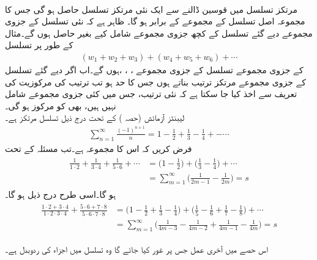 \quad {}\\
مرتکز تسلسل میں قوسین ڈالنے سے ایک نئی مرتکز تسلسل حاصل ہو گی جس کا مجموعہ اصل تسلسل کے مجموعے کے برابر ہو گا۔
\quad
ظاہر ہے کہ نئی تسلسل کے جزوی مجموعے دیے گئے تسلسل کے کچھ جزوی مجموعے  شامل کیے بغیر حاصل ہوں گے۔مثال کے طور پر تسلسل
\begin{align*}
(w_1+w_2+w_3)+(w_4+w_5+w_6)+\cdots
\end{align*} 
کے جزوی مجموعے تسلسل  کے جزوی مجموعے  ، ، ، ہوں گے۔اب اگر دیے گئے تسلسل کے جزوی مجموعے  مرتکز ترتیب بناتے ہوں جس کا حد  ہو تب ترتیب کی مرکوزیت کی تعریف سے اخذ کیا جا سکتا ہے کہ نئی ترتیب، جس میں کئی جزوی مجموعے شامل نہیں ہیں، بھی  کو مرکوز ہو گی۔
\quad {}\\
لیبنٹز آزمائش (حصہ ) کے تحت درج ذیل تسلسل مرتکز ہے۔
\begin{align*}
\sum\limits_{n=1}^{\infty} \frac{(-1)^{n+1}}{n}=1-\frac{1}{2}+\frac{1}{3}-\frac{1}{4}+-\cdots
\end{align*}
فرض کریں کہ اس کا مجموعہ  ہے۔تب مسئلہ  کے تحت
\begin{gather}
\begin{aligned}\label{مساوات_ترتیب_تسلسل_ایک}
\frac{1}{1\cdot 2}+\frac{1}{3\cdot 4}+\frac{1}{5\cdot 6}+\cdots&=\big(1-\frac{1}{2}\big)+\big(\frac{1}{3}-\frac{1}{4}\big)+\cdots\\
&=\sum\limits_{m=1}^{\infty}\big(\frac{1}{2m-1}-\frac{1}{2m}\big)=s
\end{aligned}
\end{gather}
ہو گا۔اسی طرح درج ذیل ہو گا۔
\begin{gather}
\begin{aligned}\label{مساوات_ترتیب_تسلسل_دو}
\frac{1\cdot 2+3\cdot 4}{1\cdot 2\cdot 3\cdot 4}+\frac{5\cdot 6+7\cdot 8}{5\cdot 6\cdot 7\cdot 8}&=\big(1-\frac{1}{2}+\frac{1}{3}-\frac{1}{4}\big)+\big(\frac{1}{5}-\frac{1}{6}+\frac{1}{7}-\frac{1}{8}\big)+\cdots\\
&=\sum\limits_{m=1}^{\infty} \big(\frac{1}{4m-3}-\frac{1}{4m-2}+\frac{1}{4m-1}-\frac{1}{4m}\big)=s
\end{aligned}
\end{gather}

اس حصے میں آخری عمل جس پر غور کیا جائے گا وہ تسلسل  میں اجزاء کی ردوبدل ہے۔

